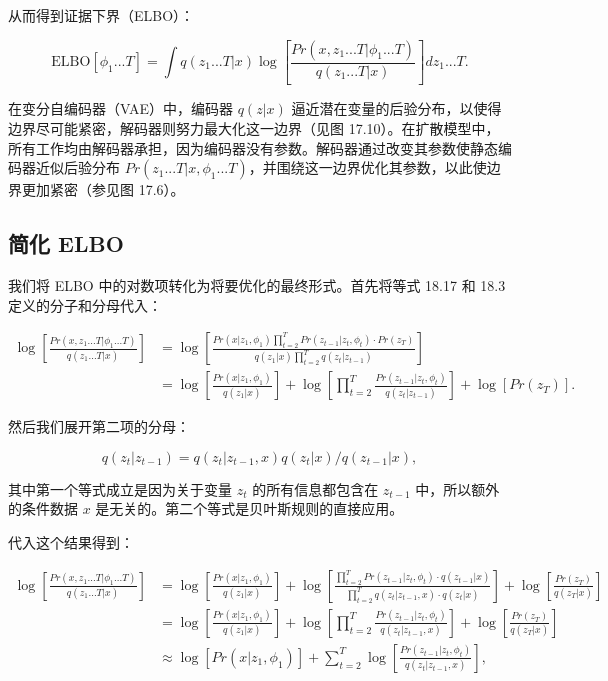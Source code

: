 从而得到证据下界（ELBO）：

\[
\text{ELBO}[\phi_1...T] = \int q(z_1...T|x) \log \left[ \frac{Pr(x, z_1...T|\phi_1...T)}{q(z_1...T|x)} \right] dz_1...T. \tag{18.21}
\]

在变分自编码器（VAE）中，编码器 \(q(z|x)\) 逼近潜在变量的后验分布，以使得边界尽可能紧密，解码器则努力最大化这一边界（见图 17.10）。在扩散模型中，所有工作均由解码器承担，因为编码器没有参数。解码器通过改变其参数使静态编码器近似后验分布 \(Pr(z_1...T|x, \phi_1...T)\)，并围绕这一边界优化其参数，以此使边界更加紧密（参见图 17.6）。


\subsection{简化 ELBO}
我们将 ELBO 中的对数项转化为将要优化的最终形式。首先将等式 18.17 和 18.3 定义的分子和分母代入：


\begin{align}
\log \left[ \frac{Pr(x, z_1...T|\phi_1...T)}{q(z_1...T|x)} \right] &= \log \left[ \frac{Pr(x|z_1, \phi_1) \prod_{t=2}^{T} Pr(z_{t-1}|z_t, \phi_t) \cdot Pr(z_T)}{q(z_1|x) \prod_{t=2}^{T} q(z_t|z_{t-1})} \right] \\
&= \log \left[ \frac{Pr(x|z_1, \phi_1)}{q(z_1|x)} \right] + \log \left[ \prod_{t=2}^{T} \frac{Pr(z_{t-1}|z_t, \phi_t)}{q(z_t|z_{t-1})} \right] + \log [ Pr(z_T) ].
\end{align} 


然后我们展开第二项的分母：

\[
q(z_t|z_{t-1}) = q(z_t|z_{t-1}, x)q(z_t|x) / q(z_{t-1}|x), \tag{18.23}
\]

其中第一个等式成立是因为关于变量 \(z_t\) 的所有信息都包含在 \(z_{t-1}\) 中，所以额外的条件数据 \(x\) 是无关的。第二个等式是贝叶斯规则的直接应用。

代入这个结果得到：

\begin{align}
\log \left[ \frac{Pr(x, z_1...T|\phi_1...T)}{q(z_1...T|x)} \right] &= \log \left[ \frac{Pr(x|z_1, \phi_1)}{q(z_1|x)} \right] + \log \left[ \frac{\prod_{t=2}^{T} Pr(z_{t-1}|z_t, \phi_t) \cdot q(z_{t-1}|x)}{\prod_{t=2}^{T} q(z_t|z_{t-1}, x) \cdot q(z_t|x)} \right] + \log \left[ \frac{Pr(z_T)}{q(z_T|x)} \right] \\
&= \log \left[ \frac{Pr(x|z_1, \phi_1)}{q(z_1|x)} \right] + \log \left[ \prod_{t=2}^{T} \frac{Pr(z_{t-1}|z_t, \phi_t)}{q(z_t|z_{t-1}, x)} \right] + \log \left[ \frac{Pr(z_T)}{q(z_T|x)} \right] \\
&\approx \log \left[ Pr(x|z_1, \phi_1) \right] + \sum_{t=2}^{T} \log \left[ \frac{Pr(z_{t-1}|z_t, \phi_t)}{q(z_t|z_{t-1}, x)} \right],
\end{align} 


